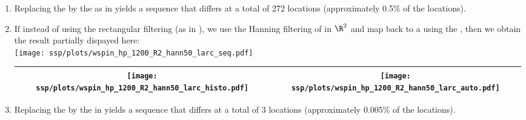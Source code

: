 \begin{example}
\begin{enumerate}
  \item \label{item:wspin_hp_rect50_R2_euclid}
        Replacing the  by the  as in 
        yields a sequence that differs at a total of 272 locations 
        (approximately 0.5\% of the locations). %

  \item \label{item:wspin_hp_hann50_R2_larc}
        If instead of using the rectangular filtering (as in ),
        we use the Hanning filtering of 
        in $\R^2$ and map back to a  using the ,
        then we obtain the result partially dispayed here:
        \\\texttt{[image: ssp/plots/wspin\_hp\_1200\_R2\_hann50\_larc\_seq.pdf]}
        \\\begin{tabular}{|>{\scs}c|>{\scs}c|}
             \hline
             \texttt{[image: ssp/plots/wspin\_hp\_1200\_R2\_hann50\_larc\_histo.pdf]}
            &\texttt{[image: ssp/plots/wspin\_hp\_1200\_R2\_hann50\_larc\_auto.pdf]}
           \\\hline
        \end{tabular}

  \item \label{item:wspin_hp_hann50_R2_euclid}
        Replacing the  by the  in 
        yields a sequence that differs at a total of 3 locations 
        (approximately 0.005\% of the locations). %
\end{enumerate}
\end{example}



